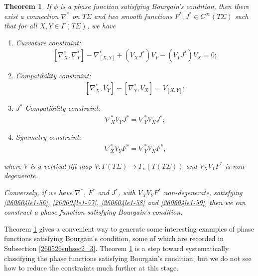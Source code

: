 \documentclass{article}
\numberwithin{equation}{section}
\theoremstyle{plain}
\newtheorem{theorem}{Theorem}[section]
\begin{document}
\begin{theorem}\label{B.C.Tao}
    If $\phi$ is a phase function satisfying Bourgain's condition, then there exist a connection $\nabla^*$ on $T\Sigma$ and two smooth functions $F^*, J^*\in C^\infty(T\Sigma)$ such that for all $X,Y\in \Gamma(T\Sigma)$, we have
    \begin{enumerate}
        \item[(1)] Curvature constraint: 
            \begin{align}\label{260604le1-56}
                [\nabla^*_X,\nabla^*_Y] - \nabla^*_{[X,Y]} + (V_X J^*)V_Y - (V_Y J^*)V_X = 0;
            \end{align} 
        \item[(2)] Compatibility constraint:
            \begin{align}\label{260604le1-57}
                [\nabla^*_X, V_Y] - [\nabla^*_Y, V_X]= V_{[X,Y]};
            \end{align}
        \item[(3)] $J^*$ Compatibility constraint: 
            \begin{align}\label{260604le1-58}
                \nabla^*_X V_Y J^* = \nabla^*_Y V_X J^*;
            \end{align}
        \item[(4)] Symmetry constraint:
            \begin{align}\label{260604le1-59}
                \nabla^*_X V_Y F^* = \nabla^*_Y V_X F^*,
            \end{align}
    \end{enumerate}
    where $V$ is a vertical lift map $V:\Gamma(T\Sigma)\to \Gamma_v(T(T\Sigma))$ and  $V_XV_YF^*$ is non-degenerate. 

    \smallskip

    Conversely, if we have $\nabla^*$, $F^*$ and $J^*$, with $V_XV_YF^*$ non-degenerate, satisfying \eqref{260604le1-56}, \eqref{260604le1-57}, \eqref{260604le1-58} and \eqref{260604le1-59}, then we can construct a phase function satisfying Bourgain's condition.
\end{theorem}

Theorem \ref{B.C.Tao} gives a convenient way to generate some interesting examples of phase functions satisfying Bourgain's condition, some of which are recorded in Subsection \ref{260526subsec2_3}. Theorem \ref{B.C.Tao} is a step toward systematically classifying the phase functions satisfying Bourgain's condition, but we do not see how to reduce the constraints much further at this stage. 
\end{document}
